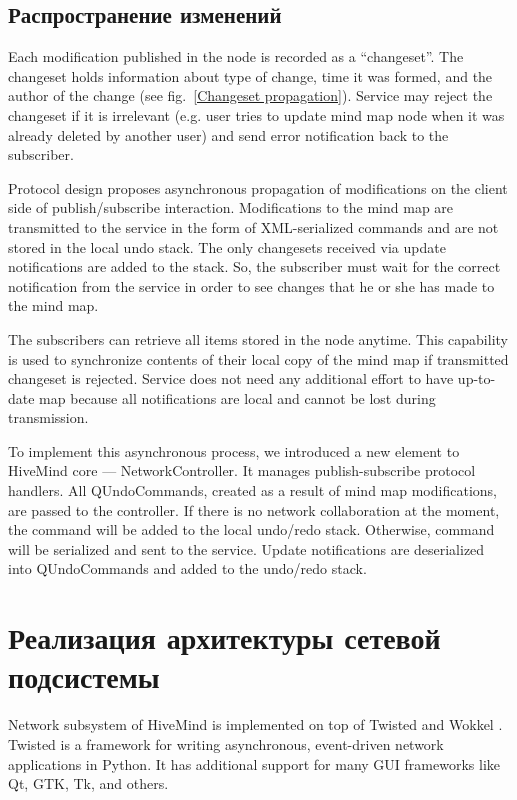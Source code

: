 \subsection{Распространение изменений}

Each modification published in the node is recorded as a ``changeset''. The
changeset holds information about type of change, time it was formed, and the
author of the change (see fig.~\ref{Changeset propagation}). Service may reject
the changeset if it is irrelevant (e.g. user tries to update mind map node when
it was already deleted by another user) and send error notification back to the
subscriber.

Protocol design proposes asynchronous propagation of modifications on the client
side of publish/subscribe interaction. Modifications to the mind map are
transmitted to the service in the form of XML-serialized commands and are not
stored in the local undo stack. The only changesets received via update
notifications are added to the stack. So, the subscriber must wait for the
correct notification from the service in order to see changes that he or she has
made to the mind map.

The subscribers can retrieve all items stored in the node anytime. This
capability is used to synchronize contents of their local copy of the mind map
if transmitted changeset is rejected. Service does not need any additional
effort to have up-to-date map because all notifications are local and cannot be
lost during transmission.

To implement this asynchronous process, we introduced a new element to HiveMind
core --- NetworkController. It manages publish-subscribe protocol handlers. All
QUndoCommands, created as a result of mind map modifications, are passed to the
controller. If there is no network collaboration at the moment, the command will
be added to the local undo/redo stack. Otherwise, command will be serialized and
sent to the service. Update notifications are deserialized into QUndoCommands
and added to the undo/redo stack.


\section{Реализация архитектуры сетевой подсистемы}

Network subsystem of HiveMind is implemented on top of Twisted \cite{twisted} and
Wokkel \cite{wokkel}. Twisted is a framework for writing asynchronous,
event-driven network applications in Python. It has additional support for many
GUI frameworks like Qt, GTK, Tk, and others.

